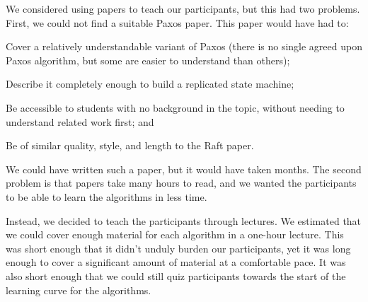 We considered using papers to teach our participants, but this had two
problems.
First, we could not find a suitable Paxos paper. This paper would have
had to:
\begin{compactitem}
\item Cover a relatively understandable variant of Paxos (there is no
single agreed upon Paxos algorithm, but some are easier to understand
than others);
\item Describe it completely enough to build a replicated state
machine;
\item Be accessible to students with no background in the topic,
without needing to understand related work first; and
\item Be of similar quality, style, and length to the Raft paper.
\end{compactitem}
We could have written such a paper, but it would have taken months.
The second problem is that papers take many hours to read,
and we wanted the participants to be able to learn
the algorithms in less time.

Instead, we decided to teach the participants through lectures. We
estimated that we could cover enough material for each algorithm in a
one-hour lecture. This was short enough that it didn't unduly burden
our participants, yet it was long enough to cover a significant amount of
material at a comfortable pace. It was also short enough that we
could still quiz participants towards the start of the learning curve
for the algorithms.


